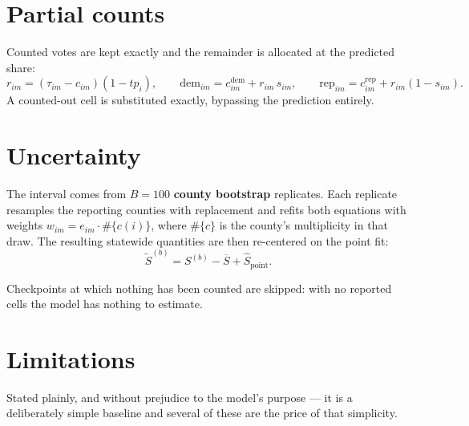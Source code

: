 \documentclass[11pt]{article}
\newcommand{\dem}{\mathrm{dem}}
\newcommand{\rep}{\mathrm{rep}}
\begin{document}
\section{Partial counts}

Counted votes are kept exactly and the remainder is allocated at the predicted share:
\begin{equation}
  r_{im} = (\tau_{im} - c_{im})(1 - tp_i),
  \qquad
  \dem_{im} = c^{\dem}_{im} + r_{im}\, s_{im},
  \qquad
  \rep_{im} = c^{\rep}_{im} + r_{im}(1 - s_{im}).
\end{equation}
A counted-out cell is substituted exactly, bypassing the prediction entirely.

\section{Uncertainty}

The interval comes from $B = 100$ \textbf{county bootstrap} replicates. Each replicate
resamples the reporting counties with replacement and refits both equations with weights
$w_{im} = e_{im} \cdot \#\{c(i)\}$, where $\#\{c\}$ is the county's multiplicity in that
draw. The resulting statewide quantities are then re-centered on the point fit:
\begin{equation}
  \tilde S^{(b)} = S^{(b)} - \overline{S} + \hat S_{\text{point}}.
  \label{eq:recentre}
\end{equation}

Checkpoints at which nothing has been counted are skipped: with no reported cells the
model has nothing to estimate.

\section*{Limitations}

Stated plainly, and without prejudice to the model's purpose --- it is a deliberately
simple baseline and several of these are the price of that simplicity.
\end{document}
